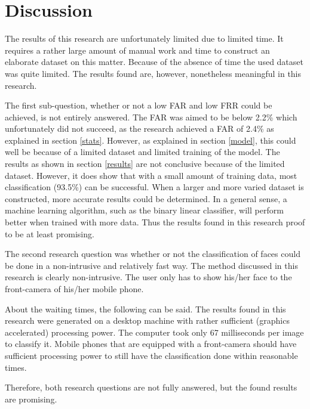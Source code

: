 \documentclass{sig-alternate-br}
\begin{document}
\section{Discussion} \label{discussion}
The results of this research are unfortunately limited due to limited time. It requires a rather large amount of manual work and time to construct an elaborate dataset on this matter. Because of the absence of time the used dataset was quite limited. The results found are, however, nonetheless meaningful in this research.

The first sub-question, whether or not a low FAR and low FRR could be achieved, is not entirely answered. The FAR was aimed to be below 2.2\% which unfortunately did not succeed, as the research achieved a FAR of 2.4\% as explained in section \ref{stats}. However, as explained in section \ref{model}, this could well be because of a limited dataset and limited training of the model. The results as shown in section \ref{results} are not conclusive because of the limited dataset. However, it does show that with a small amount of training data, most classification (93.5\%) can be successful. When a larger and more varied dataset is constructed, more accurate results could be determined. In a general sense, a machine learning algorithm, such as the binary linear classifier, will perform better when trained with more data. Thus the results found in this research proof to be at least promising.

The second research question was whether or not the classification of faces could be done in a non-intrusive and relatively fast way. The method discussed in this research is clearly non-intrusive. The user only has to show his/her face to the front-camera of his/her mobile phone.

About the waiting times, the following can be said. The results found in this research were generated on a desktop machine with rather sufficient (graphics accelerated) processing power. The computer took only 67 milliseconds per image to classify it. Mobile phones that are equipped with a front-camera should have sufficient processing power to still have the classification done within reasonable times.

Therefore, both research questions are not fully answered, but the found results are promising.




\balancecolumns
\end{document}
